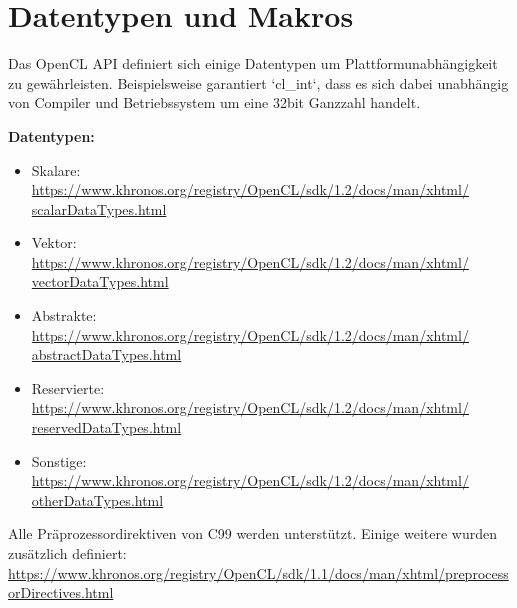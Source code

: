         \section{Datentypen und Makros}\label{makros}
		Das OpenCL \Gls{API} definiert sich einige Datentypen um Plattformunabhängigkeit zu gewährleisten. Beispielsweise garantiert \li`cl_int`, dass es sich dabei unabhängig von Compiler und Betriebssystem um eine 32bit Ganzzahl handelt.
		
        \textbf{Datentypen:}		
		
        \begin{itemize}
		    \item Skalare:\\ \href{https://www.khronos.org/registry/OpenCL/sdk/1.2/docs/man/xhtml/scalarDataTypes.html}
		    {https://www.khronos.org/registry/OpenCL/sdk/1.2/docs/man/xhtml/\\scalarDataTypes.html}
		    \item Vektor:\\ \href{https://www.khronos.org/registry/OpenCL/sdk/1.2/docs/man/xhtml/vectorDataTypes.html}
		    {https://www.khronos.org/registry/OpenCL/sdk/1.2/docs/man/xhtml/\\vectorDataTypes.html}
		    \item Abstrakte:\\ \href{https://www.khronos.org/registry/OpenCL/sdk/1.2/docs/man/xhtml/abstractDataTypes.html}
		    {https://www.khronos.org/registry/OpenCL/sdk/1.2/docs/man/xhtml/\\abstractDataTypes.html}
		    \item Reservierte:\\ \href{https://www.khronos.org/registry/OpenCL/sdk/1.2/docs/man/xhtml/reservedDataTypes.html}
		    {https://www.khronos.org/registry/OpenCL/sdk/1.2/docs/man/xhtml/\\reservedDataTypes.html}
		    \item Sonstige:\\ \href{https://www.khronos.org/registry/OpenCL/sdk/1.2/docs/man/xhtml/otherDataTypes.html}
		    {https://www.khronos.org/registry/OpenCL/sdk/1.2/docs/man/xhtml/\\otherDataTypes.html}
	    \end{itemize}		
		
	    Alle Präprozessordirektiven von C99 werden unterstützt. Einige weitere wurden zusätzlich definiert:\\ \href{https://www.khronos.org/registry/OpenCL/sdk/1.1/docs/man/xhtml/preprocessorDirectives.html}{\small https://www.khronos.org/registry/OpenCL/sdk/1.1/docs/man/xhtml/preprocessorDirectives.html}		
		
